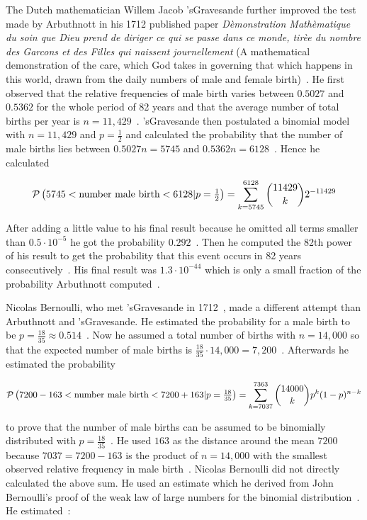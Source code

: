 The Dutch mathematician Willem Jacob 'sGravesande further improved the test made by Arbuthnott in his 1712 published paper \emph{Dèmonstration Mathèmatique du soin que Dieu prend de diriger ce qui se passe dans ce monde, tirèe du nombre des Garcons et des Filles qui naissent journellement} (A mathematical demonstration of the care, which God takes in governing that which happens in this world, drawn from the daily numbers of male and female birth)~\cite[p. 279]{hald1}. He first observed that the relative frequencies of male birth varies between $0.5027$ and $0.5362$ for the whole period of 82 years and that the average number of total births per year is $n=11,429$~\cite[p. 279]{hald1}. 'sGravesande then postulated a binomial model with $n=11,429$ and $p=\tfrac 12$ and calculated the probability that the number of male births lies between $0.5027n=5745$ and $0.5362n=6128$~\cite[p. 280]{hald1}. Hence he calculated

\begin{align}
    \P{5745 < \text{number male birth} < 6128|p=\tfrac 12} = \sum_{k=5745}^{6128} \binom{11429} k 2^{-11429}
\end{align}

After adding a little value to his final result because he omitted all terms smaller than $0.5\cdot 10^{-5}$ he got the probability $0.292$~\cite[p. 280]{hald1}. Then he computed the 82th power of his result to get the probability that this event occurs in 82 years consecutively~\cite[p. 280]{hald1}. His final result was $1.3\cdot10^{-44}$ which is only a small fraction of the probability Arbuthnott computed~\cite[p. 280]{hald1}.

Nicolas Bernoulli, who met 'sGravesande in 1712~\cite[p. 279]{hald1}, made a different attempt than Arbuthnott and 'sGravesande. He estimated the probability for a male birth to be $p=\tfrac{18}{35}\approx0.514$~\cite[p. 282]{hald1}. Now he assumed a total number of births with $n=14,000$ so that the expected number of male births is $\tfrac{18}{35}\cdot 14,000=7,200$~\cite[p. 282]{hald1}. Afterwards he estimated the probability

\begin{align}
    \P{7200-163 < \text{number male birth} < 7200+163|p=\tfrac{18}{35}} = \sum_{k=7037}^{7363} \binom {14000}{k} p^k (1-p)^{n-k}
\end{align}

to prove that the number of male births can be assumed to be binomially distributed with $p=\tfrac{18}{35}$~\cite[pp. 281-282]{hald1}. He used $163$ as the distance around the mean $7200$ because $7037=7200-163$ is the product of $n=14,000$ with the smallest observed relative frequency in male birth~\cite[p. 282]{hald1}. Nicolas Bernoulli did not directly calculated the above sum. He used an estimate which he derived from John Bernoulli's proof of the weak law of large numbers for the binomial distribution~\cite[pp. 264-267]{hald1}. He estimated~\cite[p. 282]{hald1}:

